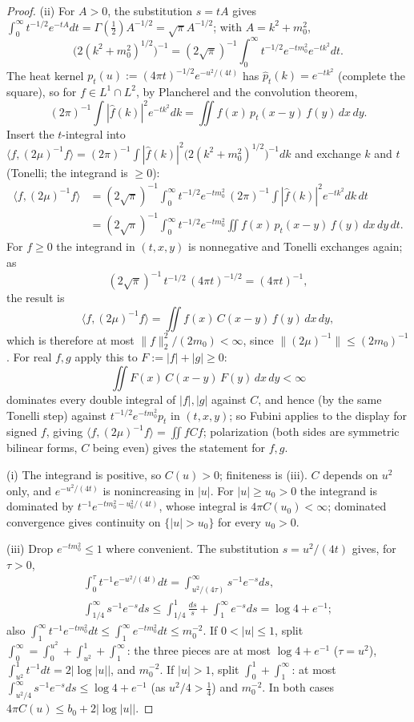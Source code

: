 \documentclass[11pt,a4paper]{article}
\theoremstyle{plain}
\theoremstyle{definition}
\theoremstyle{plain}
\theoremstyle{definition}
\newcommand{\ip}[2]{\langle #1,#2\rangle}
\begin{document}
\begin{proof}
(ii) For $A>0$, the substitution $s=tA$ gives $\int_0^\infty t^{-1/2}e^{-tA}dt=\Gamma(\frac12)
A^{-1/2}=\sqrt\pi A^{-1/2}$; with $A=k^2+m_0^2$,
\[
 \bigl(2(k^2+m_0^2)^{1/2}\bigr)^{-1}=(2\sqrt\pi)^{-1}\int_0^\infty t^{-1/2}e^{-tm_0^2}e^{-tk^2}dt .
\]
The heat kernel $p_t(u):=(4\pi t)^{-1/2}e^{-u^2/(4t)}$ has $\hat p_t(k)=e^{-tk^2}$ (complete the
square), so for $f\in L^1\cap L^2$, by Plancherel and the convolution theorem,
\[
 (2\pi)^{-1}\int|\hat f(k)|^2e^{-tk^2}dk=\iint f(x)\,p_t(x-y)\,f(y)\,dx\,dy .
\]
Insert the $t$-integral into
$\ip f{(2\mu)^{-1}f}=(2\pi)^{-1}\int|\hat f(k)|^2\bigl(2(k^2+m_0^2)^{1/2}\bigr)^{-1}dk$ and
exchange $k$ and $t$ (Tonelli; the integrand is $\ge0$):
\begin{align*}
 \ip f{(2\mu)^{-1}f}
 &=(2\sqrt\pi)^{-1}\int_0^\infty t^{-1/2}e^{-tm_0^2}\,
   (2\pi)^{-1}\!\int|\hat f(k)|^2e^{-tk^2}dk\,dt\\
 &=(2\sqrt\pi)^{-1}\int_0^\infty t^{-1/2}e^{-tm_0^2}\iint f(x)\,p_t(x-y)\,f(y)\,dx\,dy\,dt .
\end{align*}
For $f\ge0$ the integrand in $(t,x,y)$ is nonnegative and Tonelli exchanges again; as
\[
 (2\sqrt\pi)^{-1}\,t^{-1/2}\,(4\pi t)^{-1/2}=(4\pi t)^{-1},
\]
the result is
\[
 \ip f{(2\mu)^{-1}f}=\iint f(x)\,C(x-y)\,f(y)\,dx\,dy ,
\]
which is therefore at most $\|f\|_2^2/(2m_0)<\infty$, since $\|(2\mu)^{-1}\|\le(2m_0)^{-1}$.  For real $f,g$ apply this to
$F:=|f|+|g|\ge0$:
\[
 \iint F(x)\,C(x-y)\,F(y)\,dx\,dy<\infty
\]
dominates every double integral of $|f|,|g|$ against $C$, and hence (by the same Tonelli
step) against $t^{-1/2}e^{-tm_0^2}p_t$ in $(t,x,y)$; so Fubini applies to the display for
signed $f$, giving $\ip f{(2\mu)^{-1}f}=\iint fCf$; polarization (both sides are
symmetric bilinear forms, $C$ being even) gives the statement for $f,g$.

(i) The integrand is positive, so $C(u)>0$; finiteness is (iii).  $C$ depends on $u^2$
only, and $e^{-u^2/(4t)}$ is nonincreasing in $|u|$.  For $|u|\ge u_0>0$ the integrand is
dominated by $t^{-1}e^{-tm_0^2-u_0^2/(4t)}$, whose integral is $4\pi C(u_0)<\infty$; dominated
convergence gives continuity on $\{|u|>u_0\}$ for every $u_0>0$.

(iii) Drop $e^{-tm_0^2}\le1$ where convenient.  The substitution $s=u^2/(4t)$ gives,
for $\tau>0$,
\[
\begin{gathered}
 \int_0^{\tau}t^{-1}e^{-u^2/(4t)}dt=\int_{u^2/(4\tau)}^\infty s^{-1}e^{-s}ds,\\
 \int_{1/4}^\infty s^{-1}e^{-s}ds\le\int_{1/4}^1\frac{ds}s+\int_1^\infty e^{-s}ds=\log4+e^{-1};
\end{gathered}
\]
also $\int_1^\infty t^{-1}e^{-tm_0^2}dt\le\int_1^\infty e^{-tm_0^2}dt\le m_0^{-2}$.  If
$0<|u|\le1$, split $\int_0^\infty=\int_0^{u^2}+\int_{u^2}^1+\int_1^\infty$: the three pieces
are at most $\log4+e^{-1}$ ($\tau=u^2$), $\int_{u^2}^1t^{-1}dt=2|\log|u||$, and $m_0^{-2}$.  If
$|u|>1$, split $\int_0^1+\int_1^\infty$: at most $\int_{u^2/4}^\infty s^{-1}e^{-s}ds\le
\log4+e^{-1}$ (as $u^2/4>\frac14$) and $m_0^{-2}$.  In both cases $4\pi C(u)\le
b_0+2|\log|u||$.


\end{proof}
\end{document}
